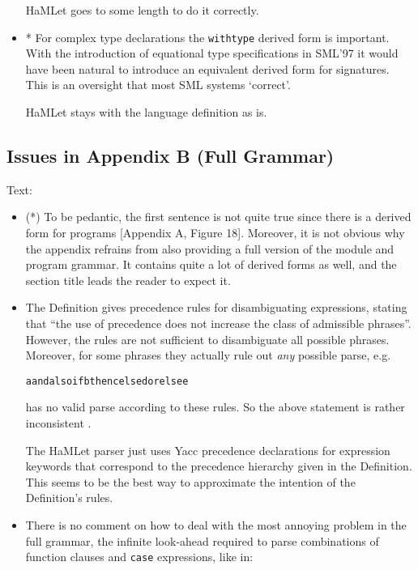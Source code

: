 \documentclass[twoside,titlepage]{article}
\begin{document}
\begin{appendix}
\begin{itemize}
HaMLet goes to some length to do it correctly.

\item * For complex type declarations the {\tt withtype} derived form is important. With the introduction of equational type specifications in SML'97 it would have been natural to introduce an equivalent derived form for signatures. This is an oversight that most SML systems `correct'.

HaMLet stays with the language definition as is.
\end{itemize}


\subsection{Issues in Appendix B (Full Grammar)}
\label{bugsappendixb}

Text:

\begin{itemize}
\item (*) To be pedantic, the first sentence is not quite true since there is a derived form for programs [Appendix A, Figure 18]. Moreover, it is not obvious why the appendix refrains from also providing a full version of the module and program grammar. It contains quite a lot of derived forms as well, and the section title leads the reader to expect it.

\item The Definition gives precedence rules for disambiguating expressions, stating that ``the use of precedence does not increase the class of admissible phrases''. However, the rules are not sufficient to disambiguate all possible phrases. Moreover, for some phrases they actually rule out {\em any} possible parse, e.g.

\begin{quoting}
\begin{alltt}
a andalso if b then c else d orelse e
\end{alltt}
\end{quoting}

has no valid parse according to these rules. So the above statement is rather inconsistent \cite{mistakes}.

The HaMLet parser just uses Yacc precedence declarations for expression keywords that correspond to the precedence hierarchy given in the Definition. This seems to be the best way to approximate the intention of the Definition's rules.

\item There is no comment on how to deal with the most annoying problem in the full grammar, the infinite look-ahead required to parse combinations of function clauses and {\tt case} expressions, like in:


\end{itemize}
\end{appendix}
\end{document}
